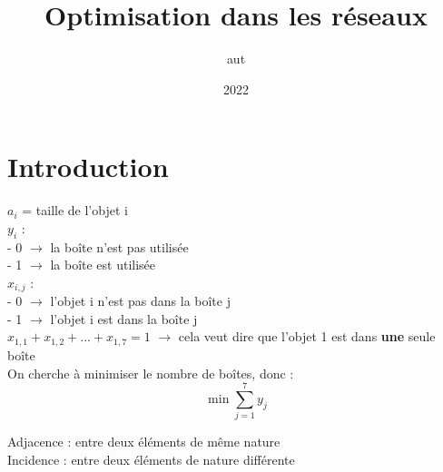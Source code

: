 \documentclass{article}
\title{Optimisation dans les réseaux}
\author{aut}
\date{2022}
\begin{document}
\maketitle

\section{Introduction}
$a_i$ = taille de l'objet i
\\%
$y_i$ :
\\- 0 $\rightarrow$ la boîte n'est pas utilisée
\\- 1 $\rightarrow$ la boîte est utilisée
\\%
$x_{i, j}$ :
\\- 0 $\rightarrow$ l'objet i n'est pas dans la boîte j
\\- 1 $\rightarrow$ l'objet i est dans la boîte j
\\%
$x_{1, 1} + x_{1, 2} + ... + x_{1, 7} = 1$ $\rightarrow$ cela veut dire que l'objet 1 est dans \textbf{une} seule boîte
\\%
On cherche à minimiser le nombre de boîtes, donc :
$$\min \sum_{j=1}^{7} y_j$$

Adjacence : entre deux éléments de même nature
\\Incidence : entre deux éléments de nature différente
\end{document}
